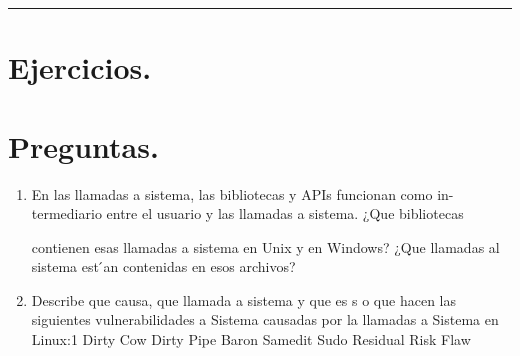 \documentclass[12pt,letterpaper]{article}
\begin{document}
\bigskip
\hrule height 0.1pt
\bigskip

\section*{Ejercicios.}

\newpage

\section*{Preguntas.}

\begin{enumerate}
\item En las llamadas a sistema, las bibliotecas y APIs funcionan como in-
termediario entre el usuario y las llamadas a sistema. ¿Que bibliotecas

contienen esas llamadas a sistema en Unix y en Windows? ¿Que llamadas
al sistema est ́an contenidas en esos archivos?
  
  \bigskip
  
\item Describe que causa, que llamada a sistema y que es s o que hacen las
siguientes vulnerabilidades a Sistema causadas por la llamadas a Sistema
en Linux:1
Dirty Cow
Dirty Pipe
Baron Samedit Sudo
Residual Risk Flaw
  
\end{enumerate}
\end{document}
